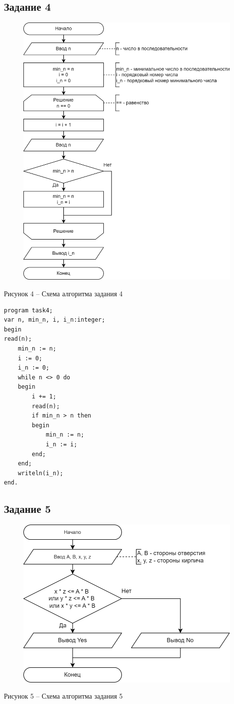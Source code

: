 \documentclass[a4paper,14pt]{extarticle}
\begin{document}
  \pagebreak
  \subsection*{Задание 4}
  \begin{figure}[h]
    \centering
    \includegraphics[width=0.6\linewidth]{schemes/t-4}
  \end{figure}
  \begin{center}
    Рисунок 4 – Схема алгоритма задания 4
  \end{center}

  \begin{lstlisting}
program task4;
var n, min_n, i, i_n:integer;
begin
read(n);
    min_n := n;
    i := 0;
    i_n := 0;
    while n <> 0 do
    begin
        i += 1;
        read(n);
        if min_n > n then
        begin
            min_n := n;
            i_n := i;
        end;
    end;
    writeln(i_n);
end.
  \end{lstlisting}

  \subsection*{Задание 5}
  \begin{figure}[h]
    \centering
    \includegraphics[width=0.6\linewidth]{schemes/t-5}
  \end{figure}
  \begin{center}
    Рисунок 5 – Схема алгоритма задания 5
  \end{center}
\end{document}

